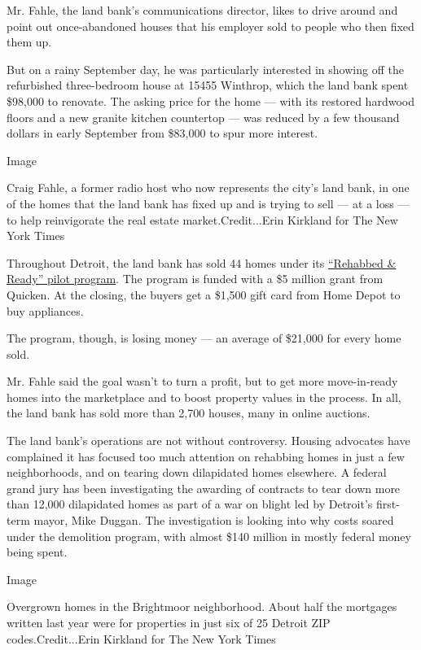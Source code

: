 Mr. Fahle, the land bank's communications director, likes to drive
around and point out once-abandoned houses that his employer sold to
people who then fixed them up.

But on a rainy September day, he was particularly interested in showing
off the refurbished three-bedroom house at 15455 Winthrop, which the
land bank spent \$98,000 to renovate. The asking price for the home ---
with its restored hardwood floors and a new granite kitchen countertop
--- was reduced by a few thousand dollars in early September from
\$83,000 to spur more interest.

Image

Craig Fahle, a former radio host who now represents the city's land
bank, in one of the homes that the land bank has fixed up and is trying
to sell --- at a loss --- to help reinvigorate the real estate
market.Credit...Erin Kirkland for The New York Times

Throughout Detroit, the land bank has sold 44 homes under its
\href{https://auctions.buildingdetroit.org/RehabbedAndReady}{``Rehabbed
\& Ready'' pilot program}. The program is funded with a \$5 million
grant from Quicken. At the closing, the buyers get a \$1,500 gift card
from Home Depot to buy appliances.

The program, though, is losing money --- an average of \$21,000 for
every home sold.

Mr. Fahle said the goal wasn't to turn a profit, but to get more
move-in-ready homes into the marketplace and to boost property values in
the process. In all, the land bank has sold more than 2,700 houses, many
in online auctions.

The land bank's operations are not without controversy. Housing
advocates have complained it has focused too much attention on rehabbing
homes in just a few neighborhoods, and on tearing down dilapidated homes
elsewhere. A federal grand jury has been investigating the awarding of
contracts to tear down more than 12,000 dilapidated homes as part of a
war on blight led by Detroit's first-term mayor, Mike Duggan. The
investigation is looking into why costs soared under the demolition
program, with almost \$140 million in mostly federal money being spent.

Image

Overgrown homes in the Brightmoor neighborhood. About half the mortgages
written last year were for properties in just six of 25 Detroit ZIP
codes.Credit...Erin Kirkland for The New York Times

